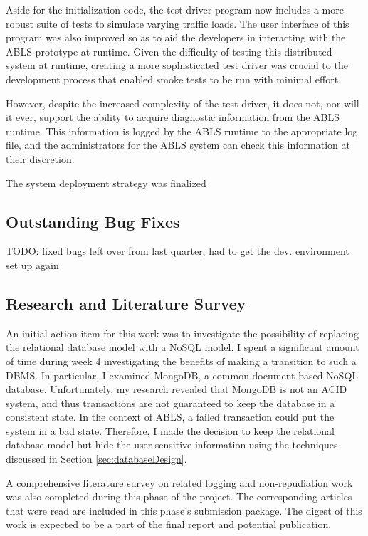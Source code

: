 \documentclass{sig-alternate}
\begin{document}
Aside for the initialization code, the test driver program now includes a more robust suite of tests to simulate varying traffic 
loads. The user interface of this program was also improved so as to aid the developers in interacting with the ABLS 
prototype at runtime. Given the difficulty of testing this distributed system at runtime, creating a more sophisticated
test driver was crucial to the development process that enabled smoke tests to be run with minimal effort.

However, despite the increased complexity of the test driver, it does not, nor will it ever, support the ability to acquire 
diagnostic information from the ABLS runtime. This information is logged by the ABLS runtime to the appropriate log 
file, and the administrators for the ABLS system can check this information at their discretion.

The system deployment strategy was finalized 

\subsection{Outstanding Bug Fixes}
TODO: fixed bugs left over from last quarter, had to get the dev. environment set up again

\subsection{Research and Literature Survey}
An initial action item for this work was to investigate the possibility of replacing the relational database model with a 
NoSQL model. I spent a significant amount of time during week 4 investigating the benefits of making a transition
to such a DBMS. In particular, I examined MongoDB, a common document-based NoSQL database. Unfortunately,
my research revealed that MongoDB is not an ACID system, and thus transactions are not guaranteed to keep the
database in a consistent state. In the context of ABLS, a failed transaction could put the system in a bad state. Therefore,
I made the decision to keep the relational database model but hide the user-sensitive information using the techniques
discussed in Section \ref{sec:databaseDesign}.

A comprehensive literature survey on related logging and non-repudiation work was also completed during this phase 
of the project. The corresponding articles that were read are included in this phase's submission package. The digest of this work is expected to be a part of the final report and potential publication.
\end{document}
